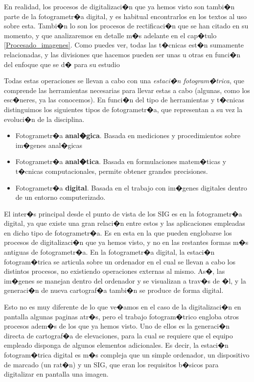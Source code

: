 En realidad, los procesos de digitalizaci�n que ya hemos visto son tambi�n parte de la fotogrametr�a digital, y es habitual encontrarlos en los textos al uso sobre esta. Tambi�n lo son los procesos de rectificaci�n que se han citado en su momento, y que analizaremos en detalle m�s adelante en el cap�tulo \ref{Procesado_imagenes}. Como puedes ver, todas las t�cnicas est�n sumamente relacionadas, y las divisiones que hacemos pueden ser unas u otras en funci�n del enfoque que se d� para su estudio

Todas estas operaciones se llevan a cabo con una \emph{estaci�n fotogram�trica}, que comprende las herramientas necesarias para llevar estas a cabo (algunas, como los esc�neres, ya las conocemos). En funci�n del tipo de herramientas y t�cnicas distinguimos los siguientes tipos de fotogrametr�a, que representan a su vez la evoluci�n de la disciplina.

\begin{itemize}
	\item Fotogrametr�a \textbf{anal�gica}. Basada en mediciones y procedimientos sobre im�genes anal�gicas
	\item Fotogrametr�a \textbf{anal�tica}. Basada en formulaciones matem�ticas y t�cnicas computacionales, permite obtener grandes precisiones.
	\item Fotogrametr�a \textbf{digital}. Basada en el trabajo con im�genes digitales dentro de un entorno computerizado.
\end{itemize}

El inter�s principal desde el punto de vista de los SIG es en la fotogrametr�a digital, ya que existe una gran relaci�n entre estos y las aplicaciones empleadas en dicho tipo de fotogrametr�a. Es en esta en la que pueden englobarse los procesos de digitalizaci�n que ya hemos visto, y no en las restantes formas m�s antiguas de fotogrametr�a. En la fotogrametr�a digital, la estaci�n fotogram�trica se articula sobre un ordenador en el cual se llevan a cabo los distintos procesos, no existiendo operaciones externas al mismo. As�, las im�genes se manejan dentro del ordenador y se visualizan a trav�s de �l, y la generaci�n de nueva cartograf�a tambi�n se produce de forma digital.

Esto no es muy diferente de lo que ve�amos en el caso de la digitalizaci�n en pantalla algunas paginas atr�s, pero el trabajo fotogram�trico engloba otros procesos adem�s de los que ya hemos visto. Uno de ellos es la generaci�n directa de cartograf�a de elevaciones, para la cual se requiere que el equipo empleado disponga de algunos elementos adicionales. Es decir, la estaci�n fotogram�trica digital es m�s compleja que un simple ordenador, un dispositivo de marcado (un rat�n) y un SIG, que eran los requisitos b�sicos para digitalizar en pantalla una imagen.

